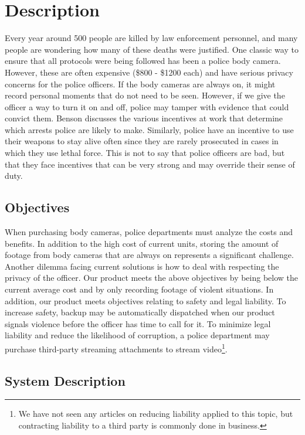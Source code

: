 \documentclass[12pt]{article}
\begin{document}
\section{Description}
Every year around 500 people are killed by law enforcement personnel, and many
people are wondering how many of these deaths were justified. One classic way
to ensure that all protocols were being followed has been a police body camera.
However, these are often expensive (\$800 - \$1200 each\cite{cam}) and have
serious privacy concerns for the police officers. If the body cameras are
always on, it might record personal moments that do not need to be seen.
However, if we give the officer a way to turn it on and off, police may tamper
with evidence that could convict them. Benson discusses the various incentives
at work that determine which arrests police are likely to
make\cite[ch.~6]{enterprise_of_law}. Similarly, police have an incentive to use
their weapons to stay alive often since they are rarely prosecuted in cases in
which they use lethal force\cite{no_conviction_1,no_conviction_2}. This is not
to say that police officers are bad, but that they face incentives that can be
very strong and may override their sense of duty.

\subsection{Objectives}
When purchasing body cameras, police departments must analyze the costs and
benefits.  In addition to the high cost of current units\cite{cam}, storing the
amount of footage from body cameras that are always on represents a significant
challenge\cite{store1,store2}. Another dilemma facing current solutions is how
to deal with respecting the privacy of the officer\cite{officer_privacy}. Our
product meets the above objectives by being below the current average cost and
by only recording footage of violent situations. In addition, our product meets
objectives relating to safety and legal liability.  To increase safety, backup
may be automatically dispatched when our product signals violence before the
officer has time to call for it. To minimize legal liability and reduce the
likelihood of corruption, a police department may purchase third-party
streaming attachments to stream video\footnote{We have not seen any articles on
    reducing liability applied to this topic, but contracting liability to a
third party is commonly done in business.}.

\subsection{System Description}
\end{document}
